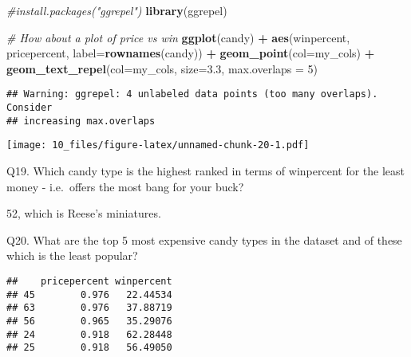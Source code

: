 \documentclass[
]{article}
\newenvironment{Shaded}{\begin{snugshade}}{\end{snugshade}}
\newcommand{\AttributeTok}[1]{\textcolor[rgb]{0.13,0.29,0.53}{#1}}
\newcommand{\CommentTok}[1]{\textcolor[rgb]{0.56,0.35,0.01}{\textit{#1}}}
\newcommand{\ConstantTok}[1]{\textcolor[rgb]{0.56,0.35,0.01}{#1}}
\newcommand{\DecValTok}[1]{\textcolor[rgb]{0.00,0.00,0.81}{#1}}
\newcommand{\FloatTok}[1]{\textcolor[rgb]{0.00,0.00,0.81}{#1}}
\newcommand{\FunctionTok}[1]{\textcolor[rgb]{0.13,0.29,0.53}{\textbf{#1}}}
\newcommand{\NormalTok}[1]{#1}
\newcommand{\OtherTok}[1]{\textcolor[rgb]{0.56,0.35,0.01}{#1}}
\newcommand{\SpecialCharTok}[1]{\textcolor[rgb]{0.81,0.36,0.00}{\textbf{#1}}}
\begin{document}
\begin{Shaded}
\begin{Highlighting}[]
\CommentTok{\#install.packages("ggrepel")}
\FunctionTok{library}\NormalTok{(ggrepel)}

\CommentTok{\# How about a plot of price vs win}
\FunctionTok{ggplot}\NormalTok{(candy) }\SpecialCharTok{+}
  \FunctionTok{aes}\NormalTok{(winpercent, pricepercent, }\AttributeTok{label=}\FunctionTok{rownames}\NormalTok{(candy)) }\SpecialCharTok{+}
  \FunctionTok{geom\_point}\NormalTok{(}\AttributeTok{col=}\NormalTok{my\_cols) }\SpecialCharTok{+} 
  \FunctionTok{geom\_text\_repel}\NormalTok{(}\AttributeTok{col=}\NormalTok{my\_cols, }\AttributeTok{size=}\FloatTok{3.3}\NormalTok{, }\AttributeTok{max.overlaps =} \DecValTok{5}\NormalTok{)}
\end{Highlighting}
\end{Shaded}

\begin{verbatim}
## Warning: ggrepel: 4 unlabeled data points (too many overlaps). Consider
## increasing max.overlaps
\end{verbatim}

\texttt{[image: 10\_files/figure-latex/unnamed-chunk-20-1.pdf]}

Q19. Which candy type is the highest ranked in terms of winpercent for
the least money - i.e.~offers the most bang for your buck?

52, which is Reese's miniatures.

Q20. What are the top 5 most expensive candy types in the dataset and of
these which is the least popular?

\begin{Shaded}
\end{Shaded}

\begin{verbatim}
##    pricepercent winpercent
## 45        0.976   22.44534
## 63        0.976   37.88719
## 56        0.965   35.29076
## 24        0.918   62.28448
## 25        0.918   56.49050
\end{verbatim}
\end{document}
